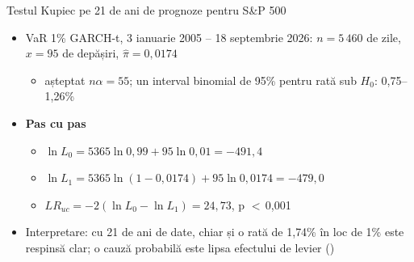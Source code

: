 \begin{frame}{Testul Kupiec pe 21 de ani de prognoze pentru S\&P 500}
\itemsize{\footnotesize}
\begin{itemize}
    \item VaR 1\% GARCH-t, 3 ianuarie 2005 -- 18 septembrie 2026: $n = 5\,460$ de zile, $x = 95$ de depășiri, $\hat\pi = 0{,}0174$
    \begin{itemize}
        \item așteptat $n\alpha = 55$; un interval binomial de 95\% pentru rată sub $H_0$: 0{,}75--1{,}26\%
    \end{itemize}
    \item \textbf{Pas cu pas}
    \begin{itemize}
        \item $\ln L_0 = 5365\ln 0{,}99 + 95\ln 0{,}01 = -491{,}4$
        \item $\ln L_1 = 5365\ln(1 - 0{,}0174) + 95\ln 0{,}0174 = -479{,}0$
        \item $LR_{uc} = -2(\ln L_0 - \ln L_1) = 24{,}73$, p $<$\,0{,}001
    \end{itemize}
    \item Interpretare: cu 21 de ani de date, chiar și o rată de 1{,}74\% în loc de 1\% este respinsă clar; o cauză probabilă este lipsa efectului de levier ()
\end{itemize}
\end{frame}

